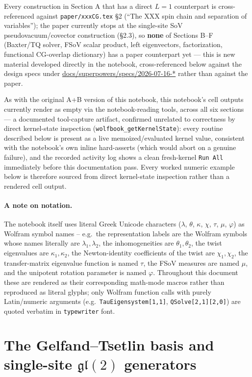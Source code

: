 \documentclass[11pt]{article}
\begin{document}
Every construction in Section A that has a direct $L=1$ counterpart is cross-referenced against
\texttt{paper/xxxCG.tex} \S2 (``The XXX spin chain and separation of variables''); the paper
currently stops at the single-site SoV pseudovacuum/covector construction (\S2.3), so
\textbf{none} of Sections B--F (Baxter/TQ solver, FSoV scalar product, left eigenvectors,
factorization, functional CG-overlap dictionary) has a paper counterpart yet --- this is new
material developed directly in the notebook, cross-referenced below against the design specs under
\url{docs/superpowers/specs/2026-07-16-*} rather than against the paper.

As with the original A+B version of this notebook, this notebook's cell outputs currently render as
empty via the notebook-reading tools, across all six sections --- a documented tool-capture
artifact, confirmed unrelated to correctness by direct kernel-state inspection
(\texttt{wolfbook\_getKernelState}): every routine described below is present as a live
memoized/evaluated kernel value, consistent with the notebook's own inline hard-asserts (which
would abort on a genuine failure), and the recorded activity log shows a clean fresh-kernel
\texttt{Run All} immediately before this documentation pass. Every worked numeric example below is
therefore sourced from direct kernel-state inspection rather than a rendered cell output.

\paragraph{A note on notation.} The notebook itself uses literal Greek Unicode characters
($\lambda$, $\theta$, $\kappa$, $\chi$, $\tau$, $\mu$, $\varphi$) as Wolfram symbol names -- e.g.\
the representation labels are the Wolfram symbols whose names literally are $\lambda_1,\lambda_2$,
the inhomogeneities are $\theta_1,\theta_2$, the twist eigenvalues are $\kappa_1,\kappa_2$, the
Newton-identity coefficients of the twist are $\chi_1,\chi_2$, the transfer-matrix eigenvalue
function is named $\tau$, the FSoV measures are named $\mu$, and the unipotent rotation parameter is
named $\varphi$. Throughout this document these are rendered as their corresponding math-mode
macros rather than reproduced as literal glyphs; only Wolfram function calls with purely
Latin/numeric arguments (e.g.\ \texttt{TauEigensystem[1,1]}, \texttt{QSolve[2,1][2,0]}) are quoted
verbatim in \texttt{typewriter} font.

\section{The Gelfand--Tsetlin basis and single-site \texorpdfstring{$\mathfrak{gl}(2)$}{gl(2)} generators}
\label{sec:gt}
\end{document}
